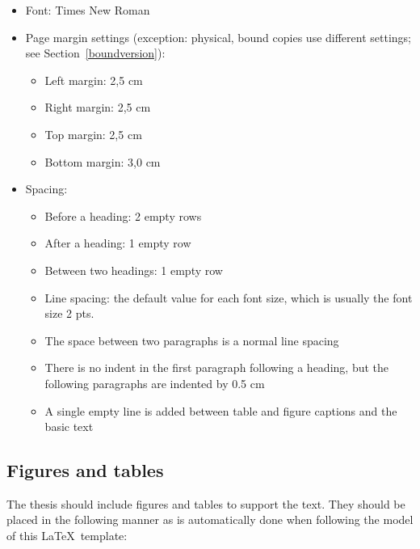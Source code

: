 \begin{itemize}
    \setlength\itemsep{0pt}
    \setlength\parskip{0pt}
  \item Font: Times New Roman
  \item Page margin settings (exception: physical, bound copies use different settings; see Section~\ref{boundversion}):
    \begin{itemize}[wide=0pt]
        \setlength\itemsep{0pt}
        \setlength\parskip{0pt}
      \item Left margin: 2,5 cm
      \item Right margin: 2,5 cm
      \item Top margin: 2,5 cm
      \item Bottom margin: 3,0 cm
    \end{itemize}
  \item Spacing:
    \begin{itemize}[wide=0pt]
        \setlength\itemsep{0pt}
        \setlength\parskip{0pt}
      \item Before a heading: 2 empty rows
      \item After a heading: 1 empty row
      \item Between two headings: 1 empty row
      \item Line spacing: the default value for each font size, which
        is usually the font size 2 pts.
      \item The space between two paragraphs is a normal line spacing
      \item There is no indent in the first paragraph following a
        heading, but the following
        paragraphs are indented by 0.5 cm
      \item A single empty line is added between table and figure
        captions and the basic text
    \end{itemize}
\end{itemize}

\subsection{Figures and tables}
The thesis should include figures and tables to support the text.
They should be placed in the following manner as is automatically
done when following the model of this \LaTeX\ template:

